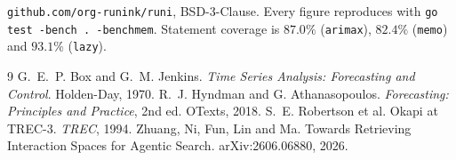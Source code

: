 \documentclass[10pt,twocolumn]{article}
\begin{document}
\texttt{github.com/org-runink/runi}, BSD-3-Clause. Every figure reproduces with
\texttt{go test -bench . -benchmem}. Statement coverage is $87.0\%$
(\texttt{arimax}), $82.4\%$ (\texttt{memo}) and $93.1\%$ (\texttt{lazy}).

\begin{thebibliography}{9}
 G.~E.~P. Box and G.~M. Jenkins. \emph{Time Series Analysis:
Forecasting and Control}. Holden-Day, 1970.
 R.~J. Hyndman and G. Athanasopoulos. \emph{Forecasting:
Principles and Practice}, 2nd ed. OTexts, 2018.
 S.~E. Robertson et al. Okapi at TREC-3. \emph{TREC}, 1994.
 Zhuang, Ni, Fun, Lin and Ma. Towards Retrieving Interaction Spaces
for Agentic Search. arXiv:2606.06880, 2026.
\end{thebibliography}
\end{document}
